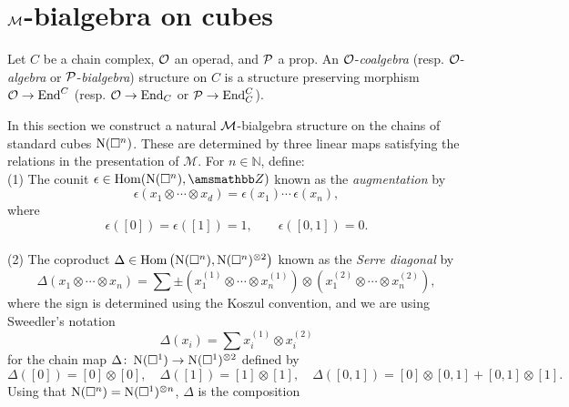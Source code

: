 
\section{$\M$-bialgebra on cubes} \label{s:coaction}

Let $C$ be a chain complex, $\O$ an operad, and $\P$ a prop.
An $\O$-\textit{coalgebra} (resp. $\O$-\textit{algebra} or $\P$-\textit{bialgebra}) structure on $C$ is a structure preserving morphism $\O \to \End^C$ (resp. $\O \to \End_C$ or $\P \to \End_C^C$).

In this section we construct a natural $\M$-bialgebra structure on the chains of standard cubes $\cchains(\cube^n)$.
These are determined by three linear maps satisfying the relations in the presentation of $\mathcal M$.
For $n \in \mathbb{N}$, define: \vspace*{5pt} \\
(1) The counit $\epsilon \in \Hom(\cchains(\square^n), \Z)$ known as the \textit{augmentation} by
\begin{equation*}
\epsilon \left( x_1 \otimes \cdots \otimes x_d \right) = \epsilon(x_1) \cdots \, \epsilon(x_n),
\end{equation*}
where
\begin{equation*}
\epsilon([0]) = \epsilon([1]) = 1, \qquad \epsilon([0, 1]) = 0.
\end{equation*} \vspace*{-6pt} \\
(2) The coproduct $\Delta \in \Hom \left( \cchains(\square^n), \cchains(\square^n)^{\otimes 2} \right)$ known as the \textit{Serre diagonal} by
\begin{equation*}	
\Delta (x_1 \otimes \cdots \otimes x_n) = 	
\sum \pm \left( x_1^{(1)} \otimes \cdots \otimes x_n^{(1)} \right) \otimes 	
\left( x_1^{(2)} \otimes \cdots \otimes x_n^{(2)} \right),	
\end{equation*}	
where the sign is determined using the Koszul convention, and we are using Sweedler's notation
\begin{equation*}	
\Delta(x_i) = \sum x_i^{(1)} \otimes x_i^{(2)}
\end{equation*}
for the chain map $\Delta \colon \cchains(\square^1) \to \cchains(\square^1)^{\otimes 2}$ defined by
\begin{equation*}
\Delta([0]) = [0] \otimes [0], \quad \Delta([1]) = [1] \otimes [1], \quad \Delta([0, 1]) = [0] \otimes [0, 1] + [0, 1] \otimes [1].
\end{equation*}
Using that $\cchains(\square^n) = \cchains(\square^1)^{\otimes n}$, $\Delta$ is the composition
